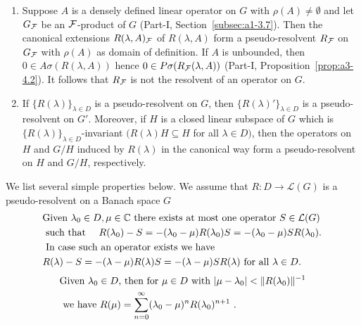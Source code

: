 \begin{example}\label{ex:c3-2.5}
	\begin{enumerate}[\upshape (i), wide, labelindent=.25em]
		\item 
		Suppose $A$ is a densely defined linear operator on $G$ with $\rho(A) \neq \emptyset$ and let $G_{\mathcal{F}}$ be an $\mathcal{F}$-product of\/ $G$ (\cf Part-I, Section~\ref{subsec:a1-3.7}).
		Then the canonical extensions $R(\lambda,A)_{\mathcal{F}}$ of\/ $R(\lambda,A)$ form a pseudo-resolvent $R_{\mathcal{F}}$ on $G_{\mathcal{F}}$ with $\rho(A)$ as domain of definition.
		If\/ $A$ is unbounded, then $0 \in A\sigma(R(\lambda,A))$ hence $0 \in P\sigma(R_{\mathcal{F}}(\lambda,A))$ (\cf Part-I, Proposition~\ref{prop:a3-4.2}).
		It follows that $R_{\mathcal{F}}$ is not the resolvent of an operator on $G$.
		
		\item 
		If\/ $\{R(\lambda)\}_{\lambda\in D}$ is a pseudo-resolvent on $G$, then $\{R(\lambda)'\}_{\lambda\in D}$ is a pseudo-resolvent on $G'$.
		Moreover, if\/ $H$ is a closed linear subspace of\/ $G$ which is $\{R(\lambda)\}_{\lambda\in D}$-invariant $(R(\lambda)H \subseteq H$ for all $\lambda \in D)$, then the operators on $H$ and $G/H$ induced by $R(\lambda)$ in the canonical way form a pseudo-resolvent on $H$ and $G/H$, respectively.
	\end{enumerate}
\end{example}
We list several simple properties below.
We assume that $R \colon D \to \mathcal{L}(G)$ is a pseudo-resolvent on a Banach space $G$
\begin{equation}\label{eq:c3-2.10}
	\begin{split}
	&\text{Given  $\lambda_{0} \in D, \mu \in \mathbb{C} $  there exists at most one operator  $S \in \mathcal{L}(G)$ }\\
	&\text{ such that \quad $R(\lambda_{0}) - S = -(\lambda_{0}-\mu)R(\lambda_{0})S = -(\lambda_{0}-\mu)SR(\lambda_{0})$} .\\
	&\text{ In case such an operator exists we have} \\
	&\text{$R(\lambda) - S = -(\lambda-\mu)R(\lambda)S = -(\lambda-\mu)SR(\lambda)$ for all $\lambda \in D$} .
	\end{split}
\end{equation}
\begin{equation}\label{eq:c3-2.11}
	\begin{split}
	&\text{Given  $\lambda_{0} \in D$,  then for  $\mu \in D$  with  $|\mu-\lambda_{0}| < \|R(\lambda_{0})\|^{-1}$}\\ 
	&\text{ we have $ R(\mu) = \sum_{n=0}^{\infty} (\lambda_{0}-\mu)^n R(\lambda_{0})^{n+1}$ } .
	\end{split}
\end{equation}
